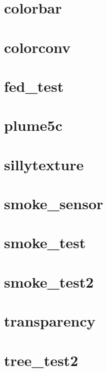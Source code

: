 \documentclass[11pt,twoside]{book}
\begin{document}
\section{colorbar}
\label{FDScolorbar}

\section{colorconv}
\label{FDScolorconv}

\section{fed\_test}

\section{plume5c}
\label{FDSplume5c}

\section{sillytexture}

\section{smoke\_sensor}
\label{FDSsmokesensor}

\section{smoke\_test}
\label{FDSsmoketest}

\section{smoke\_test2}
\label{FDSsmoketest2}

\section{transparency}
\label{FDStransparency}

\section{tree\_test2}
\end{document}
